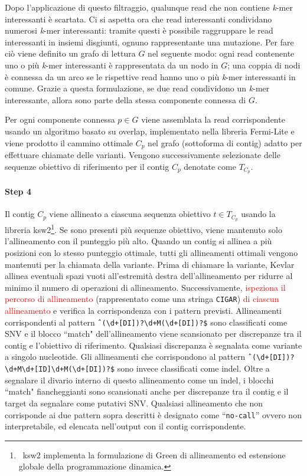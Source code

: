 \documentclass[../main.tex]{subfiles}
\begin{document}
Dopo l'applicazione di questo filtraggio, qualunque read che non contiene \textit{k}-mer interessanti è scartata. Ci si aspetta ora che read interessanti condividano numerosi \textit{k}-mer interessanti: tramite questi è possibile raggruppare le read interessanti in insiemi disgiunti, ognuno rappresentante una mutazione. Per fare ciò viene definito un grafo di lettura $G$ nel seguente modo: ogni read contenente uno o più \textit{k}-mer interessanti è rappresentata da un nodo in $G$; una coppia di nodi è connessa da un arco se le rispettive read hanno uno o più \textit{k}-mer interessanti in comune. Grazie a questa formulazione, se due read condividono un \textit{k}-mer interessante, allora sono parte della stessa componente connessa di $G$. 

Per ogni componente connessa $p\in G$ viene assemblata la read corrispondente usando un algoritmo basato su overlap, implementato nella libreria Fermi-Lite e viene prodotto il cammino ottimale $C_p$ nel grafo (sottoforma di contig) adatto per effettuare chiamate delle varianti. Vengono successivamente selezionate delle sequenze obiettivo di riferimento per il contig $C_p$ denotate come $T_{C_p}$.

\paragraph{Step 4} Il contig $C_p$ viene allineato a ciascuna sequenza obiettivo $t \in T_{C_p}$ usando la libreria ksw2\footnote{\ ksw2 implementa la formulazione di Green di allineamento ed estensione globale della programmazione dinamica.}. 
Se sono presenti più sequenze obiettivo, viene mantenuto solo l'allineamento con il punteggio più alto. Quando un contig si allinea a più posizioni con lo stesso punteggio ottimale, tutti gli allineamenti ottimali vengono mantenuti per la chiamata della variante.
Prima di chiamare la variante, Kevlar allinea eventuali spazi vuoti all'estremità destra dell'allineamento per ridurre al minimo il numero di operazioni di allineamento. Successivamente, \textcolor{red}{ispeziona il percorso di allineamento} (rappresentato come una stringa \texttt{CIGAR}) \textcolor{red}{di ciascun allineamento} e verifica la corrispondenza con i pattern previsti. Allineamenti corrispondenti al pattern \verb|ˆ(\d+[DI])?\d+M(\d+[DI])?$| sono classificati come SNV e il blocco ``match" dell'allineamento viene scansionato per discrepanze tra il contig e l'obiettivo di riferimento. Qualsiasi discrepanza è segnalata come variante a singolo nucleotide. Gli allineamenti che corrispondono al pattern \verb|ˆ(\d+[DI])?\d+M\d+[ID]\d+M(\d+[DI])?$| sono invece classificati come indel. Oltre a segnalare il divario interno di questo allineamento come un indel, i blocchi ``match" fiancheggianti sono
scansionati anche per discrepanze tra il contig e il target da segnalare come putativi SNV. Qualsiasi allineamento che non corrisponde ai due pattern sopra descritti è designato come ``\texttt{no-call}'' ovvero non interpretabile, ed elencata nell'output con il contig corrispondente. 
\end{document}

